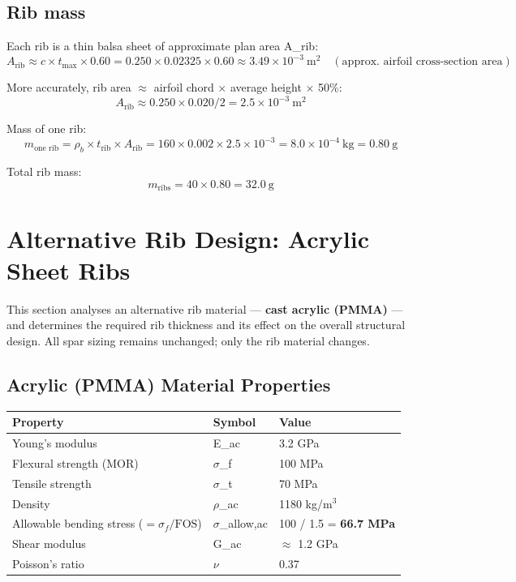 \documentclass[10pt,a4paper]{article}
\begin{document}
\subsection{Rib mass}

Each rib is a thin balsa sheet of approximate plan area A\_rib:
\[
A_{\text{rib}} \approx c \times t_{\max} \times 0.60 = 0.250 \times 0.02325 \times 0.60 \approx 3.49 \times 10^{-3}\ \text{m}^2 \quad (\text{approx. airfoil cross-section area})
\]

More accurately, rib area ${\approx}$ airfoil chord ${\times}$ average height ${\times}$ 50\%:
\[
A_{\text{rib}} \approx 0.250 \times 0.020 / 2 = 2.5 \times 10^{-3}\ \text{m}^2
\]

Mass of one rib:
\[
m_{\text{one rib}} = \rho_b \times t_{\text{rib}} \times A_{\text{rib}} = 160 \times 0.002 \times 2.5 \times 10^{-3} = 8.0 \times 10^{-4}\ \text{kg} = 0.80\ \text{g}
\]

Total rib mass:
\[
m_{\text{ribs}} = 40 \times 0.80 = 32.0\ \text{g}
\]

\newpage \section{Alternative Rib Design: Acrylic Sheet Ribs}

This section analyses an alternative rib material --- \textbf{cast acrylic (PMMA)} --- and determines the required rib thickness and its effect on the overall structural design. All spar sizing remains unchanged; only the rib material changes.

\subsection{Acrylic (PMMA) Material Properties}

\begin{center}
\begin{tabular}{|l|l|l|}
\hline
Property & Symbol & Value \\
\hline
Young's modulus & E\_ac & 3.2 GPa \\
\hline
Flexural strength (MOR) & ${\sigma}$\_f & 100 MPa \\
\hline
Tensile strength & ${\sigma}$\_t & 70 MPa \\
\hline
Density & ${\rho}$\_ac & 1180 kg/m$^{3}$ \\
\hline
Allowable bending stress ($= \sigma_f / \text{FOS}$) & ${\sigma}$\_allow,ac & 100 / 1.5 = \textbf{66.7 MPa} \\
\hline
Shear modulus & G\_ac & $\approx$ 1.2 GPa \\
\hline
Poisson's ratio & ${\nu}$ & 0.37 \\
\hline
\end{tabular}
\end{center}
\end{document}
